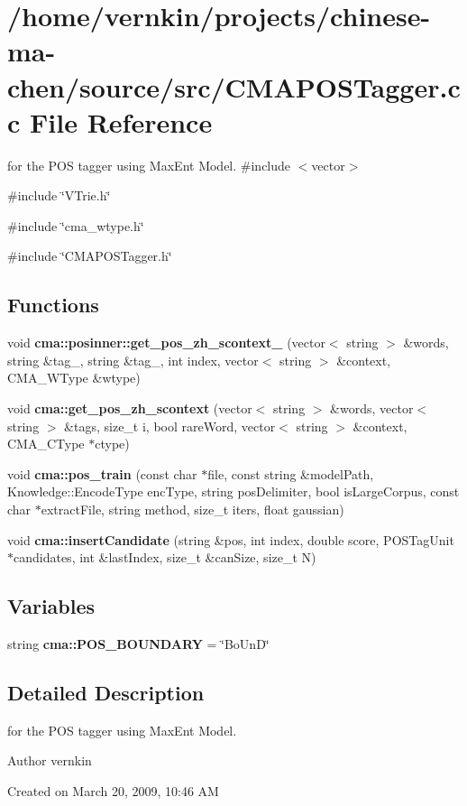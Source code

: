\section{/home/vernkin/projects/chinese-\/ma-\/chen/source/src/CMAPOSTagger.cc File Reference}
\label{CMAPOSTagger_8cc}


for the POS tagger using MaxEnt Model.  
{\ttfamily \#include $<$vector$>$}\par
{\ttfamily \#include \char`\"{}VTrie.h\char`\"{}}\par
{\ttfamily \#include \char`\"{}cma\_\-wtype.h\char`\"{}}\par
{\ttfamily \#include \char`\"{}CMAPOSTagger.h\char`\"{}}\par
\subsection*{Functions}
\begin{DoxyCompactItemize}
\item 
void {\bfseries cma::posinner::get\_\-pos\_\-zh\_\-scontext\_} (vector$<$ string $>$ \&words, string \&tag\_, string \&tag\_, int index, vector$<$ string $>$ \&context, CMA\_\-WType \&wtype)\label{namespacecma_1_1posinner_af49e6c147898b0b7d3e88af33c64e8f1}

\item 
void {\bf cma::get\_\-pos\_\-zh\_\-scontext} (vector$<$ string $>$ \&words, vector$<$ string $>$ \&tags, size\_\-t i, bool rareWord, vector$<$ string $>$ \&context, CMA\_\-CType $\ast$ctype)
\item 
void {\bf cma::pos\_\-train} (const char $\ast$file, const string \&modelPath, Knowledge::EncodeType encType, string posDelimiter, bool isLargeCorpus, const char $\ast$extractFile, string method, size\_\-t iters, float gaussian)
\item 
void {\bfseries cma::insertCandidate} (string \&pos, int index, double score, POSTagUnit $\ast$candidates, int \&lastIndex, size\_\-t \&canSize, size\_\-t N)\label{namespacecma_adbf7620e7e9b8dd78dbcb87e648fa8ae}

\end{DoxyCompactItemize}
\subsection*{Variables}
\begin{DoxyCompactItemize}
\item 
string {\bfseries cma::POS\_\-BOUNDARY} = \char`\"{}BoUnD\char`\"{}\label{namespacecma_a6d33cf1fe0a06dac555f3a85fec6c4a6}

\end{DoxyCompactItemize}


\subsection{Detailed Description}
for the POS tagger using MaxEnt Model. \begin{DoxyAuthor}{Author}
vernkin
\end{DoxyAuthor}
Created on March 20, 2009, 10:46 AM 